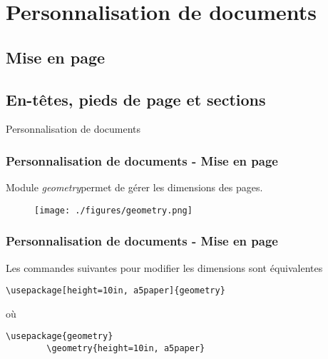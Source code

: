 
\section{Personnalisation de documents}

\subsection{Mise en page}

\subsection{En-têtes, pieds de page et sections}

\begin{frame}
    \vfill
    \begin{center}
        \large
        Personnalisation de documents
    \end{center}
    \vfill
\end{frame}

\begin{frame}
    \frametitle{Personnalisation de documents - Mise en page}
    Module \textcolor{hard_green}{\textit{geometry}}\footnotemark permet de gérer les dimensions des pages.
    \begin{figure}
        \centering
            \texttt{[image: ./figures/geometry.png]}
            \label{fig: geometry}
    \end{figure}
\end{frame}

\begin{frame}[fragile]
    \frametitle{Personnalisation de documents - Mise en page}
    Les commandes suivantes pour modifier les dimensions sont équivalentes
    \vfill
    \begin{lstlisting}[xleftmargin=-10mm]
        \usepackage[height=10in, a5paper]{geometry}
    \end{lstlisting}
    \vfill
    \centering
    où
    \vfill
    \begin{lstlisting}[xleftmargin=-10mm]
        \usepackage{geometry}
        \geometry{height=10in, a5paper}
    \end{lstlisting}
\end{frame}

